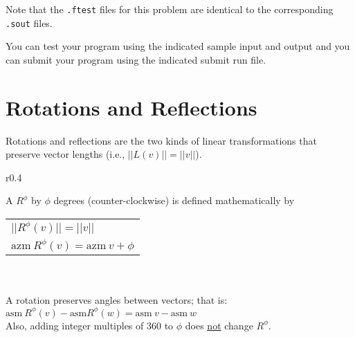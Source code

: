 \documentclass[12pt]{article}
\begin{document}
Note that the {\tt .ftest} files for this problem are identical
to the corresponding {\tt .sout} files.

You can test your program using the indicated sample input and
output and you can submit your program using the indicated submit
run file.

\section{Rotations and Reflections}
Rotations and reflections are the two kinds of linear transformations
that preserve vector lengths (i.e., $||L(v)||=||v||$).

\begin{minipage}{\textwidth}\raggedright
\begin{wrapfigure}[5]{r}{0.4\textwidth}
\end{wrapfigure}
A  $R^\phi$ by $\phi$ degrees (counter-\EOL clockwise)
is defined mathematically by
\hspace*{0.2in}\begin{tabular}[t]{l}
$||R^\phi(v)|| = ||v||$ \\
$\mathrm{azm}~R^\phi(v) = \mathrm{azm}~v + \phi$ \\
\end{tabular} \\
~\\
A rotation preserves angles between vectors; that is: \\
\hspace*{0.2in}$\mathrm{asm}~R^\phi(v)-\mathrm{asm}R^\phi(w)
               = \mathrm{asm}~v-\mathrm{asm}~w$ \\
Also, adding integer multiples of 360 to $\phi$
does \underline{not} change $R^\phi$.
\end{minipage}
\end{document}
